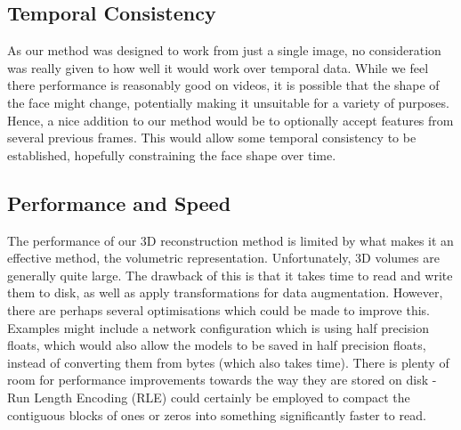 \subsection{Temporal Consistency}

As our method was designed to work from just a single image, no
consideration was really given to how well it would work over temporal
data. While we feel there performance is reasonably good on videos, it
is possible that the shape of the face might change, potentially
making it unsuitable for a variety of purposes. Hence, a nice addition
to our method would be to optionally accept features from several
previous frames. This would allow some temporal consistency to be
established, hopefully constraining the face shape over time.

\subsection{Performance and Speed}

The performance of our 3D reconstruction method is limited by what
makes it an effective method, the volumetric
representation. Unfortunately, 3D volumes are generally quite
large. The drawback of this is that it takes time to read and write
them to disk, as well as apply transformations for data
augmentation. However, there are perhaps several optimisations which
could be made to improve this. Examples might include a network
configuration which is using half precision floats, which would also
allow the models to be saved in half precision floats, instead of
converting them from bytes (which also takes time). There is plenty of
room for performance improvements towards the way they are stored on
disk - Run Length Encoding (RLE) could certainly be employed to
compact the contiguous blocks of ones or zeros into something
significantly faster to read.


